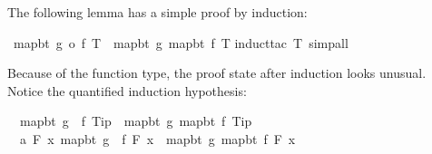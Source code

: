 \begin{isabellebody}
\begin{isamarkuptext}
The following lemma has a simple proof by induction:%
\end{isamarkuptext}%
\isamarkuptrue%
\isamarkupfalse%
\ {}map{}bt\ {}g\ o\ f{}\ T\ {}\ map{}bt\ g\ {}map{}bt\ f\ T{}{}\isanewline
%
\isadelimproof
%
\endisadelimproof
%
\isatagproof
{}\isamarkupfalse%
{}induct{}tac\ T{}\ simp{}all{}\isanewline
{}\isamarkupfalse%
%
\endisatagproof
{\isafoldproof}%
%
\isadelimproof
%
\endisadelimproof
%
\isadelimproof
%
\endisadelimproof
%
\isatagproof
%
\begin{isamarkuptxt}%
\noindent
Because of the function type, the proof state after induction looks unusual.
Notice the quantified induction hypothesis:
\begin{isabelle}%
\ {}{}\ map{}bt\ {}g\ {}\ f{}\ Tip\ {}\ map{}bt\ g\ {}map{}bt\ f\ Tip{}\isanewline
\ {}{}\ {}a\ F{}\ {}{}x{}\ map{}bt\ {}g\ {}\ f{}\ {}F\ x{}\ {}\ map{}bt\ g\ {}map{}bt\ f\ {}F\ x{}{}{}\ {}\isanewline

\end{isabelle}
\end{isamarkuptxt}
\end{isabellebody}
